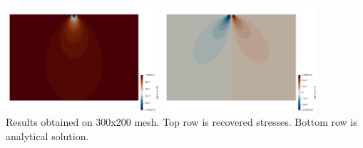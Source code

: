 \begin{center}
\includegraphics[width=5.7cm]{python_codes/fieldstone_34/results/exp4/sigma_yy_th}
\includegraphics[width=5.7cm]{python_codes/fieldstone_34/results/exp4/sigma_xy_th}\\
{\captionfont Results obtained on 300x200 mesh. Top row is recovered stresses. 
Bottom row is analytical solution.}
\end{center}

